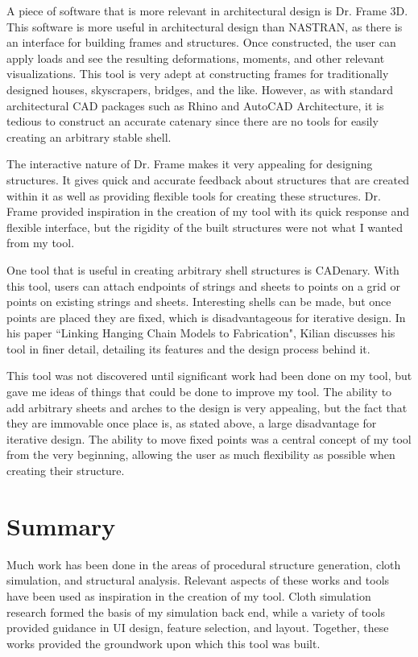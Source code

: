 \documentclass{thesis}
\begin{document}
A piece of software that is more relevant in architectural design is Dr. Frame 3D\cite{drframe}.  This
software is more useful in architectural design than NASTRAN, as there is an interface for building frames
and structures.  Once constructed, the user can apply loads and see the resulting deformations, moments,
and other relevant visualizations.  This tool is very adept at constructing frames for traditionally
designed houses, skyscrapers, bridges, and the like.  However, as with standard architectural CAD packages
such as Rhino\cite{rhino} and AutoCAD Architecture\cite{autocad}, it is tedious to construct an accurate
catenary since there are no tools for easily creating an arbitrary stable shell.

The interactive nature of Dr. Frame makes it very appealing for designing structures.  It gives quick and
accurate feedback about structures that are created within it as well as providing flexible tools for
creating these structures.  Dr. Frame provided inspiration in the creation of my tool with its quick
response and flexible interface, but the rigidity of the built structures were not what I wanted from
my tool.

One tool that is useful in creating arbitrary shell structures is CADenary\cite{cadenary}.  With this tool,
users can attach endpoints of strings and sheets to points on a grid or points on existing strings and sheets.
Interesting shells can be made, but once points are placed they are fixed, which is disadvantageous for
iterative design.  In his paper ``Linking Hanging Chain Models to Fabrication"\cite{kilian05cadenary}, Kilian
discusses his tool in finer detail, detailing its features and the design process behind it.

This tool was not discovered until significant work had been done on my tool, but gave me ideas of things that
could be done to improve my tool.  The ability to add arbitrary sheets and arches to the design is very appealing,
but the fact that they are immovable once place is, as stated above, a large disadvantage for iterative design.
The ability to move fixed points was a central concept of my tool from the very beginning, allowing the user
as much flexibility as possible when creating their structure.

\section{Summary}
Much work has been done in the areas of procedural structure generation, cloth simulation, and structural analysis.
Relevant aspects of these works and tools have been used as inspiration in the creation of my tool.  Cloth simulation
research formed the basis of my simulation back end, while a variety of tools provided guidance in UI design, feature
selection, and layout.  Together, these works provided the groundwork upon which this tool was built.
\end{document}
